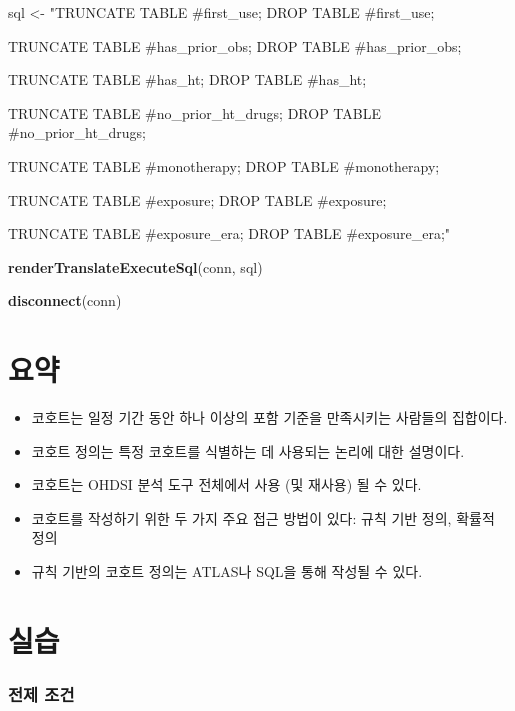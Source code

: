 \documentclass[11pt]{book}
\newenvironment{Shaded}{\begin{snugshade}}{\end{snugshade}}
\newcommand{\KeywordTok}[1]{\textcolor[rgb]{0.13,0.29,0.53}{\textbf{#1}}}
\newcommand{\StringTok}[1]{\textcolor[rgb]{0.31,0.60,0.02}{#1}}
\newcommand{\NormalTok}[1]{#1}
\theoremstyle{definition}
\theoremstyle{definition}
\theoremstyle{definition}
\theoremstyle{remark}
\let\BeginKnitrBlock\begin \let\EndKnitrBlock\end
\begin{document}
\begin{Shaded}
\begin{Highlighting}[]
\NormalTok{sql <-}\StringTok{ "TRUNCATE TABLE #first_use;}
\StringTok{DROP TABLE #first_use;}

\StringTok{TRUNCATE TABLE #has_prior_obs;}
\StringTok{DROP TABLE #has_prior_obs;}

\StringTok{TRUNCATE TABLE #has_ht;}
\StringTok{DROP TABLE #has_ht;}

\StringTok{TRUNCATE TABLE #no_prior_ht_drugs;}
\StringTok{DROP TABLE #no_prior_ht_drugs;}

\StringTok{TRUNCATE TABLE #monotherapy;}
\StringTok{DROP TABLE #monotherapy;}

\StringTok{TRUNCATE TABLE #exposure;}
\StringTok{DROP TABLE #exposure;}

\StringTok{TRUNCATE TABLE #exposure_era;}
\StringTok{DROP TABLE #exposure_era;"}

\KeywordTok{renderTranslateExecuteSql}\NormalTok{(conn, sql)}

\KeywordTok{disconnect}\NormalTok{(conn)}
\end{Highlighting}
\end{Shaded}

\section{요약}\label{-8}

\BeginKnitrBlock{rmdsummary}
\begin{itemize}
\item
  코호트는 일정 기간 동안 하나 이상의 포함 기준을 만족시키는 사람들의
  집합이다.
\item
  코호트 정의는 특정 코호트를 식별하는 데 사용되는 논리에 대한 설명이다.
\item
  코호트는 OHDSI 분석 도구 전체에서 사용 (및 재사용) 될 수 있다.
\item
  코호트를 작성하기 위한 두 가지 주요 접근 방법이 있다: 규칙 기반 정의,
  확률적 정의
\item
  규칙 기반의 코호트 정의는 ATLAS나 SQL을 통해 작성될 수 있다.
\end{itemize}
\EndKnitrBlock{rmdsummary}

\section{실습}

\subsubsection*{전제 조건}\label{--2}
\end{document}
